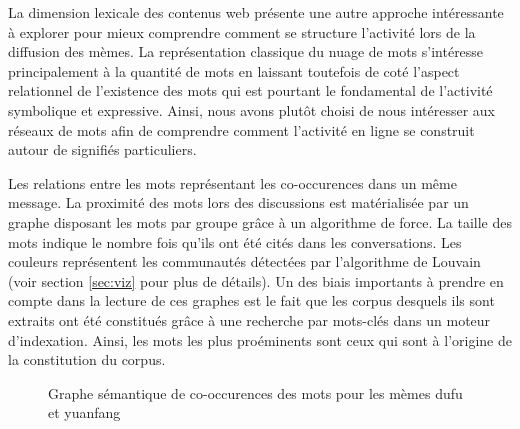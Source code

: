 La dimension lexicale des contenus web pr\'esente une autre approche int\'eressante \`a explorer pour mieux comprendre comment se structure l{\textquoteright}activit\'e lors de la diffusion des m\`emes. La repr\'esentation classique du nuage de mots s{\textquoteright}int\'eresse principalement \`a la quantit\'e de mots en laissant toutefois de cot\'e l{\textquoteright}aspect relationnel de l{\textquoteright}existence des mots qui est pourtant le fondamental de l{\textquoteright}activit\'e symbolique et expressive. Ainsi, nous avons plut\^ot choisi de nous int\'eresser aux r\'eseaux de mots afin de comprendre comment l{\textquoteright}activit\'e en ligne se construit autour de signifi\'es particuliers. 

Les relations entre les mots représentant les co-occurences dans un même message. La proximité des mots lors des discussions est matérialisée par un graphe disposant les mots par groupe grâce à un algorithme de force. La taille des mots indique le nombre fois qu'ils ont été cités dans les conversations. Les couleurs représentent les communautés détectées par l'algorithme de Louvain \cite{Blondel2008} (voir section \ref{sec:viz} pour plus de détails). Un des biais importants \`a prendre en compte dans la lecture de ces graphes est le fait que les corpus desquels ils sont extraits ont \'et\'e constitu\'es gr\^ace \`a une recherche par mots-cl\'es dans un moteur d{\textquoteright}indexation. Ainsi, les mots les plus pro\'eminents sont ceux qui sont \`a l{\textquoteright}origine de la constitution du corpus. 

\begin{figure}[h!]
    \centering
    
  \caption{
    Graphe s\'emantique de co-occurences des mots pour les m\`emes dufu et yuanfang   
  }
\end{figure}

